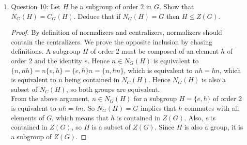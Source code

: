 \documentclass{article}
\begin{document}
\begin{enumerate}
\begin{enumerate}
        \begin{proof}
          The equivalence relation is true by chasing definitions: If $h\in
          N_H(A)$, then it must be contained in $H$, and also contained in
          the normalizer of $A$ with respect to $G$; if $h$ is contained in
          $H$ and is also contained in the normalizer of $A$ with respect
          to $G$, then $h$ must be in $N_H(A)$. \\

          We first show that the intersection of subgroups $H_1$ and $H_2$
          is a subgroup of the both subgroups: $H_1\cap H_2$ is non-empty
          since it contains $e$.  Also, if $a,b\in H_1\cap H_2$, then
          $ab^{-1}\in H_1,H_2$ since $H_1$ and $H_2$ are subgroups,
          implying that $ab^{-1}\in H_1\cap H_2$, which concludes our proof
          that $H_1\cap H_2$ is a subgroup of $H_1$ and $H_2$. So since
          both $H$ and $N_G(A)$ are subgroups of $G$, their intersection
          must be a subgroup of $H$, as we are required to show.
        \end{proof}

      \item Question 10: Let $H$ be a subgroup of order 2 in $G$. Show that
        $N_G(H)=C_G(H)$. Deduce that if $N_G(H)=G$ then $H\leq Z(G)$.

        \begin{proof}
          By definition of normalizers and centralizers, normalizers
          should contain the centralizers. We prove the opposite inclusion
          by chasing definitions. A subgroup $H$ of order 2 must be
          composed of an element $h$ of order 2 and the identity $e$. Hence
          $n\in N_G(H)$ is equivalent to
          $\{n,nh\}=n\{e,h\}=\{e,h\}n=\{n,hn\}$, which is equivalent to
          $nh=hn$, which is equivalent to $n$ being contained in $N_C(H)$.
          Hence $N_G(H)$ is also a subset of $N_C(H)$, so both groups are
          equivalent. \\

          From the above argument, $n\in N_G(H)$ for a subgroup $H=\{e,h\}$
          of order 2 is equivalent to $nh=hn$. So $N_G(H)=G$ implies that
          $h$ commutes with all elements of $G$, which means that $h$ is
          contained in $Z(G)$. Also, $e$ is contained in $Z(G)$, so $H$ is
          a subset of $Z(G)$. Since $H$ is also a group, it is a subgroup
          of $Z(G)$.
        \end{proof}


\end{enumerate}
\end{enumerate}
\end{document}
